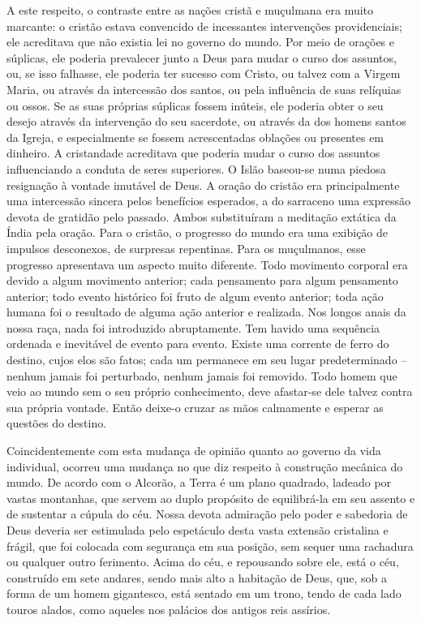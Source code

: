 \documentclass[11pt,a5paper,twoside,openany]{book}
\begin{document}
A este respeito, o contraste entre as nações cristã e muçulmana era muito marcante: o cristão estava convencido de incessantes intervenções providenciais; ele acreditava que não existia lei no governo do mundo. Por meio de orações e súplicas, ele poderia prevalecer junto a Deus para mudar o curso dos assuntos, ou, se isso falhasse, ele poderia ter sucesso com Cristo, ou talvez com a Virgem Maria, ou através da intercessão dos santos, ou pela influência de suas relíquias ou ossos. Se as suas próprias súplicas fossem inúteis, ele poderia obter o seu desejo através da intervenção do seu sacerdote, ou através da dos homens santos da Igreja, e especialmente se fossem acrescentadas oblações ou presentes em dinheiro. A cristandade acreditava que poderia mudar o curso dos assuntos influenciando a conduta de seres superiores. O Islão baseou-se numa piedosa resignação à vontade imutável de Deus. A oração do cristão era principalmente uma intercessão sincera pelos benefícios esperados, a do sarraceno uma expressão devota de gratidão pelo passado. Ambos substituíram a meditação extática da Índia pela oração. Para o cristão, o progresso do mundo era uma exibição de impulsos desconexos, de surpresas repentinas. Para os muçulmanos, esse progresso apresentava um aspecto muito diferente. Todo movimento corporal era devido a algum movimento anterior; cada pensamento para algum pensamento anterior; todo evento histórico foi fruto de algum evento anterior; toda ação humana foi o resultado de alguma ação anterior e realizada. Nos longos anais da nossa raça, nada foi introduzido abruptamente. Tem havido uma sequência ordenada e inevitável de evento para evento. Existe uma corrente de ferro do destino, cujos elos são fatos; cada um permanece em seu lugar predeterminado – nenhum jamais foi perturbado, nenhum jamais foi removido. Todo homem que veio ao mundo sem o seu próprio conhecimento, deve afastar-se dele talvez contra sua própria vontade. Então deixe-o cruzar as mãos calmamente e esperar as questões do destino.

Coincidentemente com esta mudança de opinião quanto ao governo da vida individual, ocorreu uma mudança no que diz respeito à construção mecânica do mundo. De acordo com o Alcorão, a Terra é um plano quadrado, ladeado por vastas montanhas, que servem ao duplo propósito de equilibrá-la em seu assento e de sustentar a cúpula do céu. Nossa devota admiração pelo poder e sabedoria de Deus deveria ser estimulada pelo espetáculo desta vasta extensão cristalina e frágil, que foi colocada com segurança em sua posição, sem sequer uma rachadura ou qualquer outro ferimento. Acima do céu, e repousando sobre ele, está o céu, construído em sete andares, sendo mais alto a habitação de Deus, que, sob a forma de um homem gigantesco, está sentado em um trono, tendo de cada lado touros alados, como aqueles nos palácios dos antigos reis assírios.
\end{document}
